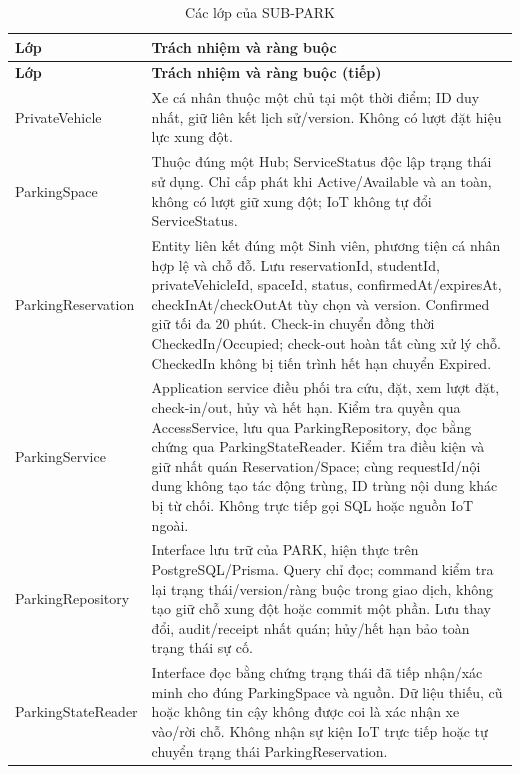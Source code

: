 \begin{longtable}{|L{37mm}|L{102mm}|}
\caption{Các lớp của SUB-PARK}\\\hline
\textbf{Lớp} & \textbf{Trách nhiệm và ràng buộc}\\\hline
\endfirsthead
\hline\textbf{Lớp} & \textbf{Trách nhiệm và ràng buộc (tiếp)}\\\hline\endhead
PrivateVehicle & Xe cá nhân thuộc một chủ tại một thời điểm; ID duy nhất, giữ liên kết lịch sử/version. Không có lượt đặt hiệu lực xung đột.\\\hline
ParkingSpace & Thuộc đúng một Hub; ServiceStatus độc lập trạng thái sử dụng. Chỉ cấp phát khi Active/Available và an toàn, không có lượt giữ xung đột; IoT không tự đổi ServiceStatus.\\\hline
Parking\allowbreak Reservation & Entity liên kết đúng một Sinh viên, phương tiện cá nhân hợp lệ và chỗ đỗ. Lưu reservationId, studentId, privateVehicleId, spaceId, status, confirmedAt/expiresAt, checkInAt/checkOutAt tùy chọn và version. Confirmed giữ tối đa 20 phút. Check-in chuyển đồng thời CheckedIn/Occupied; check-out hoàn tất cùng xử lý chỗ. CheckedIn không bị tiến trình hết hạn chuyển Expired.\\\hline
ParkingService & Application service điều phối tra cứu, đặt, xem lượt đặt, check-in/out, hủy và hết hạn. Kiểm tra quyền qua AccessService, lưu qua ParkingRepository, đọc bằng chứng qua Parking\allowbreak State\allowbreak Reader. Kiểm tra điều kiện và giữ nhất quán Reservation/Space; cùng requestId/nội dung không tạo tác động trùng, ID trùng nội dung khác bị từ chối. Không trực tiếp gọi SQL hoặc nguồn IoT ngoài.\\\hline
ParkingRepository & Interface lưu trữ của PARK, hiện thực trên PostgreSQL/Prisma. Query chỉ đọc; command kiểm tra lại trạng thái/version/ràng buộc trong giao dịch, không tạo giữ chỗ xung đột hoặc commit một phần. Lưu thay đổi, audit/receipt nhất quán; hủy/hết hạn bảo toàn trạng thái sự cố.\\\hline
Parking\allowbreak State\allowbreak Reader & Interface đọc bằng chứng trạng thái đã tiếp nhận/xác minh cho đúng ParkingSpace và nguồn. Dữ liệu thiếu, cũ hoặc không tin cậy không được coi là xác nhận xe vào/rời chỗ. Không nhận sự kiện IoT trực tiếp hoặc tự chuyển trạng thái Parking\allowbreak Reservation.\\\hline
\end{longtable}


